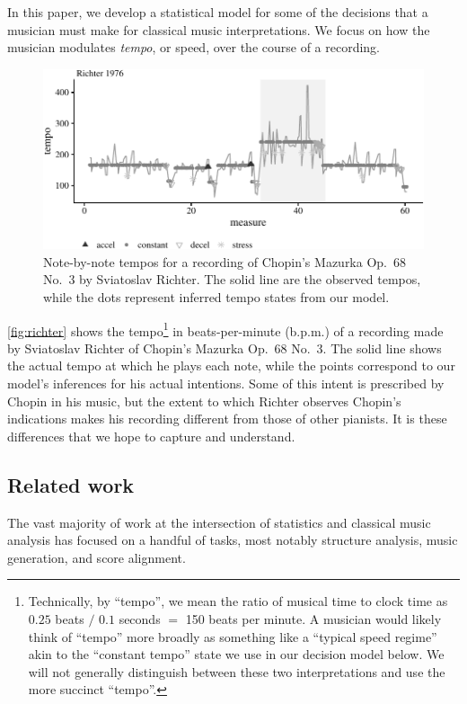 \documentclass[aoas]{imsart}
\begin{document}
In this paper, we develop a statistical model for some of the
decisions that a musician must make for classical music
interpretations. We focus on how the musician modulates
{\it tempo}, or speed, over the course of a recording. 
\begin{figure}[t]
  \centering
  \includegraphics[width=.9\linewidth]{richter-1}
  \caption{Note-by-note tempos for a recording of Chopin's Mazurka
    Op.\ 68 No.\ 3 by Sviatoslav Richter. The solid line are the
    observed tempos, while the dots represent inferred tempo states
    from our model. }
  \label{fig:richter}
\end{figure}
\autoref{fig:richter} shows the tempo\footnote{Technically, by
  ``tempo'', we mean the ratio of musical time to clock time as $0.25$
  beats $/$ $0.1$ seconds $=$ 150 beats per minute. A musician would
  likely think of ``tempo'' more broadly as something like a ``typical
  speed regime'' akin to the ``constant tempo'' state we use in our
  decision model below. We will not generally distinguish between
  these two interpretations and use the more succinct ``tempo''.}
  in beats-per-minute (b.p.m.) of
a recording made by Sviatoslav Richter of Chopin's Mazurka Op.\ 68
No.\ 3. The solid line shows the actual tempo at which he plays each
note, while the points correspond to our model's inferences
for his actual intentions. Some of this intent is prescribed  by
Chopin in his music, but the extent to which Richter observes Chopin's
indications makes his recording different from those of other
pianists. It is these differences that we hope to capture and understand.

\subsection{Related work}
\label{sec:related-work}


 

The vast majority of work at the intersection of statistics
and classical music analysis has focused on a handful of tasks,
most notably structure analysis, music generation, and score
alignment.
\end{document}
